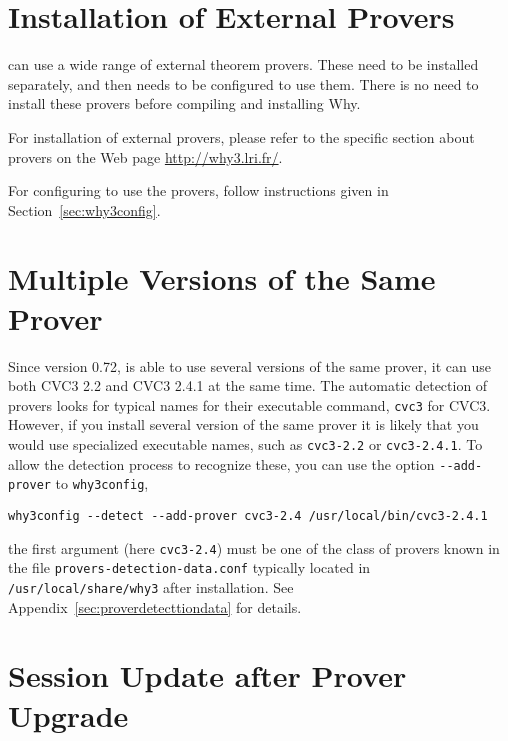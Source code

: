 \section{Installation of External Provers}
\label{provers}

\why can use a wide range of external theorem provers. These need to
be installed separately, and then \why needs to be configured to use
them. There is no need to install these provers before compiling and
installing Why.

For installation of external provers, please refer to the specific
section about provers on the Web page \url{http://why3.lri.fr/}.

For configuring \why to use the provers, follow instructions given in
Section~\ref{sec:why3config}.

\section{Multiple Versions of the Same Prover}

Since version 0.72, \why is able to use several versions of the same
prover, \eg it can use both CVC3 2.2 and CVC3 2.4.1 at the same time.
The automatic detection of provers looks for typical names for their
executable command, \eg \texttt{cvc3} for CVC3. However, if you
install several version of the same prover it is likely that you would
use specialized executable names, such as \texttt{cvc3-2.2} or
\texttt{cvc3-2.4.1}. To allow the \why detection process to recognize
these, you can use the option \verb|--add-prover| to
\texttt{why3config}, \eg
\begin{verbatim}
why3config --detect --add-prover cvc3-2.4 /usr/local/bin/cvc3-2.4.1
\end{verbatim}
the first argument (here \verb|cvc3-2.4|) must be one of the class of
provers known in the file \verb|provers-detection-data.conf| typically
located in \verb|/usr/local/share/why3| after installation. See
Appendix~\ref{sec:proverdetecttiondata} for details.


\section{Session Update after Prover Upgrade}
\label{sec:uninstalledprovers}

